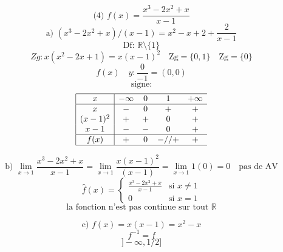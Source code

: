\documentclass{article}
\begin{document}
\[ \text{(4) } f(x) = \frac{x^3 - 2x^2 + x}{x-1} \]
\[ \text{a) } (x^3 - 2x^2 + x) / (x-1) = x^2 - x + 2 + \frac{2}{x-1} \]
\[ \text{Df: } \mathbb{R} \setminus \{1\} \]
\[ Zg: x(x^2 - 2x + 1) = x(x-1)^2 \quad \text{Zg} = \{0,1\} \quad \text{Zg} = \{0\} \]
\[ f(x) \quad y : \frac{0}{-1} = (0,0) \]
\[ \text{signe:} \]
\[ \begin{array}{|c|ccccccc|} \hline x & -\infty & 0 & 1 & +\infty \\ \hline x & -  & 0 & + & + \\ (x-1)^2 & + & + & 0 & + \\ x-1 & - & - & 0 & + \\ \hline f(x) & + & 0 & - // + & + \\ \hline \end{array} \]

\[ \text{b) } \lim_{x \to 1} \frac{x^3 - 2x^2 + x}{x-1} = \lim_{x \to 1} \frac{x(x-1)^2}{(x-1)} = \lim_{x \to 1} 1(0) = 0 \quad \text{pas de AV} \]
\[ \hat{f}(x) = \begin{cases} \frac{x^3 - 2x^2 + x}{x-1} & \text{si } x \neq 1 \\ 0 & \text{si } x = 1 \end{cases} \]
\[ \text{la fonction n'est pas continue sur tout } \mathbb{R} \]

\[ \text{c) } f(x) = x(x-1) = x^2 - x \]
\[ f^{-1} = f \]
\[ ]-\infty, 1/2] \]
\end{document}
